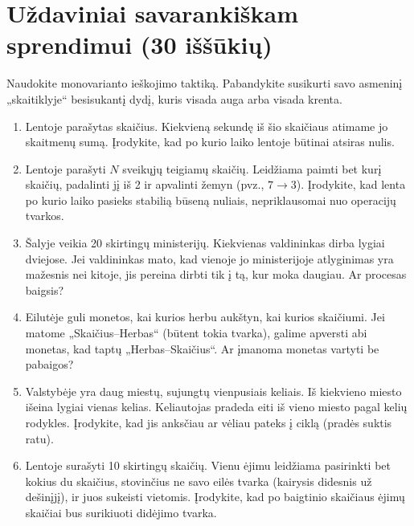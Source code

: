 \documentclass[11pt,a4paper]{scrartcl}
\begin{document}
\newpage
\section{Uždaviniai savarankiškam sprendimui (30 iššūkių)}

Naudokite monovarianto ieškojimo taktiką. Pabandykite susikurti savo asmeninį „skaitiklyje“ besisukantį dydį, kuris visada auga arba visada krenta.

\begin{enumerate}
    \renewcommand{\labelenumi}{\textbf{\theenumi.}}
    
    \item Lentoje parašytas skaičius. Kiekvieną sekundę iš šio skaičiaus atimame jo skaitmenų sumą. Įrodykite, kad po kurio laiko lentoje būtinai atsiras nulis.
    \item Lentoje parašyti $N$ sveikųjų teigiamų skaičių. Leidžiama paimti bet kurį skaičių, padalinti jį iš 2 ir apvalinti žemyn (pvz., $7 \to 3$). Įrodykite, kad lenta po kurio laiko pasieks stabilią būseną nuliais, nepriklausomai nuo operacijų tvarkos.
    \item Šalyje veikia 20 skirtingų ministerijų. Kiekvienas valdininkas dirba lygiai dviejose. Jei valdininkas mato, kad vienoje jo ministerijoje atlyginimas yra mažesnis nei kitoje, jis pereina dirbti tik į tą, kur moka daugiau. Ar procesas baigsis?
    \item Eilutėje guli monetos, kai kurios herbu aukštyn, kai kurios skaičiumi. Jei matome „Skaičius–Herbas“ (būtent tokia tvarka), galime apversti abi monetas, kad taptų „Herbas–Skaičius“. Ar įmanoma monetas vartyti be pabaigos?
    \item Valstybėje yra daug miestų, sujungtų vienpusiais keliais. Iš kiekvieno miesto išeina lygiai vienas kelias. Keliautojas pradeda eiti iš vieno miesto pagal kelių rodykles. Įrodykite, kad jis anksčiau ar vėliau pateks į ciklą (pradės suktis ratu).
    \item Lentoje surašyti 10 skirtingų skaičių. Vienu ėjimu leidžiama pasirinkti bet kokius du skaičius, stovinčius ne savo eilės tvarka (kairysis didesnis už dešinįjį), ir juos sukeisti vietomis. Įrodykite, kad po baigtinio skaičiaus ėjimų skaičiai bus surikiuoti didėjimo tvarka.
    

\end{enumerate}
\end{document}
